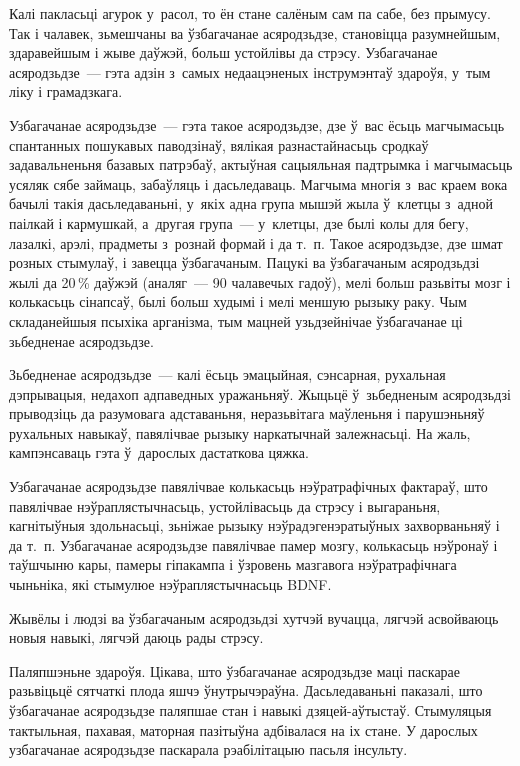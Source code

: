 Калі пакласьці агурок у~расол, то ён стане салёным сам па сабе, без прымусу. Так і чалавек, зьмешчаны ва ўзбагачанае асяродзьдзе, становіцца разумнейшым, здаравейшым і жыве даўжэй, больш устойлівы да стрэсу. Узбагачанае асяродзьдзе~--- гэта адзін з~самых недаацэненых інструмэнтаў здароўя, у~тым ліку і грамадзкага.

Узбагачанае асяродзьдзе~--- гэта такое асяродзьдзе, дзе ў~вас ёсьць магчымасьць спантанных пошукавых паводзінаў, вялікая разнастайнасьць сродкаў задавальненьня базавых патрэбаў, актыўная сацыяльная падтрымка і магчымасьць усяляк сябе займаць, забаўляць і дасьледаваць. Магчыма многія з~вас краем вока бачылі такія дасьледаваньні, у~якіх адна група мышэй жыла ў~клетцы з~адной паілкай і кармушкай, а~другая група~--- у~клетцы, дзе былі колы для бегу, лазалкі, арэлі, прадметы з~рознай формай і да т.~п. Такое асяродзьдзе, дзе шмат розных стымулаў, і завецца ўзбагачаным. Пацукі ва ўзбагачаным асяродзьдзі жылі да 20\,\% даўжэй (аналяг~--- 90 чалавечых гадоў), мелі больш разьвіты мозг і колькасьць сінапсаў, былі больш худымі і мелі меншую рызыку раку. Чым складанейшыя псыхіка арганізма, тым мацней узьдзейнічае ўзбагачанае ці зьбедненае асяродзьдзе.

Зьбедненае асяродзьдзе~--- калі ёсьць эмацыйная, сэнсарная, рухальная дэпрывацыя, недахоп адпаведных уражаньняў. Жыцьцё ў~зьбедненым асяродзьдзі прыводзіць да разумовага адставаньня, неразьвітага маўленьня і парушэньняў рухальных навыкаў, павялічвае рызыку наркатычнай залежнасьці. На жаль, кампэнсаваць гэта ў~дарослых дастаткова цяжка.

Узбагачанае асяродзьдзе павялічвае колькасьць нэўратрафічных фактараў, што павялічвае нэўраплястычнасьць, устойлівасьць да стрэсу і выгараньня, кагнітыўныя здольнасьці, зьніжае рызыку нэўрадэгенэратыўных захворваньняў і да т.~п. Узбагачанае асяродзьдзе павялічвае памер мозгу, колькасьць нэўронаў і таўшчыню кары, памеры гіпакампа і ўзровень мазгавога нэўратрафічнага чыньніка, які стымулюе нэўраплястычнасьць BDNF. 

Жывёлы і людзі ва ўзбагачаным асяродзьдзі хутчэй вучацца, лягчэй асвойваюць новыя навыкі, лягчэй даюць рады стрэсу. 

Паляпшэньне здароўя. Цікава, што ўзбагачанае асяродзьдзе маці паскарае разьвіцьцё сятчаткі плода яшчэ ўнутрычэраўна. Дасьледаваньні паказалі, што ўзбагачанае асяродзьдзе паляпшае стан і навыкі дзяцей-аўтыстаў. Стымуляцыя тактыльная, пахавая, маторная пазітыўна адбівалася на іх стане. У дарослых узбагачанае асяродзьдзе паскарала рэабілітацыю пасьля інсульту.

